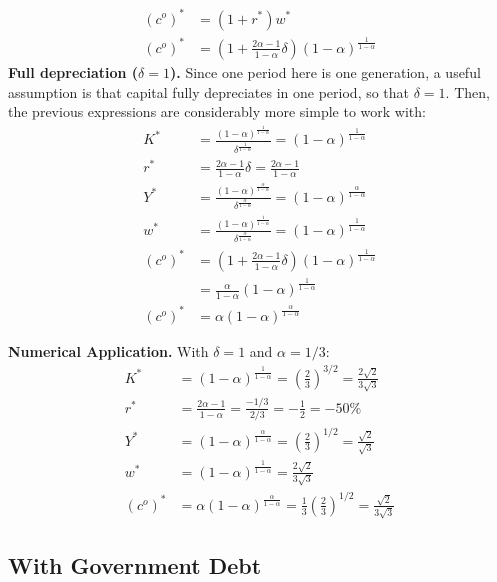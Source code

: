\documentclass[]{book}
\theoremstyle{definition}
\theoremstyle{definition}
\theoremstyle{definition}
\theoremstyle{remark}
\begin{document}
\[
\begin{aligned}
(c^{o})^{*}&=(1+r^*)w^{*}\\
(c^{o})^{*}&=\left(1+ \frac{2\alpha-1}{1-\alpha}\delta\right)\left(1-\alpha\right)^{\frac{1}{1-\alpha}}
\end{aligned}
\] \textbf{Full depreciation (\(\delta = 1\)).} Since one period here is
one generation, a useful assumption is that capital fully depreciates in
one period, so that \(\delta = 1\). Then, the previous expressions are
considerably more simple to work with: \[
\begin{aligned}
K^{*}&=\frac{(1-\alpha)^{\frac{1}{1-\alpha}}}{\delta^{\frac{1}{1-\alpha}}}=(1-\alpha)^{\frac{1}{1-\alpha}}\\
r^{*}&=\frac{2\alpha-1}{1-\alpha}\delta = \frac{2\alpha-1}{1-\alpha}\\
Y^{*}&=\frac{(1-\alpha)^{\frac{\alpha}{1-\alpha}}}{\delta^{\frac{\alpha}{1-\alpha}}} = (1-\alpha)^{\frac{\alpha}{1-\alpha}}\\
w^{*} &= \frac{\left(1-\alpha\right)^{\frac{1}{1-\alpha}}}{\delta^{\frac{\alpha}{1-\alpha}}} = (1-\alpha)^{\frac{1}{1-\alpha}}\\
(c^{o})^{*}&=\left(1+ \frac{2\alpha-1}{1-\alpha}\delta\right)\left(1-\alpha\right)^{\frac{1}{1-\alpha}}\\
&=\frac{\alpha}{1-\alpha}\left(1-\alpha\right)^{\frac{1}{1-\alpha}}\\
(c^{o})^{*}&= \alpha\left(1-\alpha\right)^{\frac{\alpha}{1-\alpha}}
\end{aligned}
\]

\textbf{Numerical Application.} With \(\delta = 1\) and
\(\alpha = 1/3\): \[
\begin{aligned}
K^{*}&=(1-\alpha)^{\frac{1}{1-\alpha}}=\left(\frac{2}{3}\right)^{3/2}=\frac{2\sqrt{2}}{3\sqrt{3}}\\
r^{*}&=\frac{2\alpha-1}{1-\alpha}=\frac{-1/3}{2/3}=-\frac{1}{2}=-50\%\\
Y^{*}&=(1-\alpha)^{\frac{\alpha}{1-\alpha}} = \left(\frac{2}{3}\right)^{1/2}=\frac{\sqrt{2}}{\sqrt{3}}\\
w^{*}&=\left(1-\alpha\right)^{\frac{1}{1-\alpha}} =\frac{2\sqrt{2}}{3\sqrt{3}}\\
(c^{o})^{*}&=\alpha\left(1-\alpha\right)^{\frac{\alpha}{1-\alpha}}=\frac{1}{3} \left(\frac{2}{3}\right)^{1/2}=\frac{\sqrt{2}}{3\sqrt{3}}
\end{aligned}
\]

\subsection{With Government Debt}\label{with-government-debt}
\end{document}
